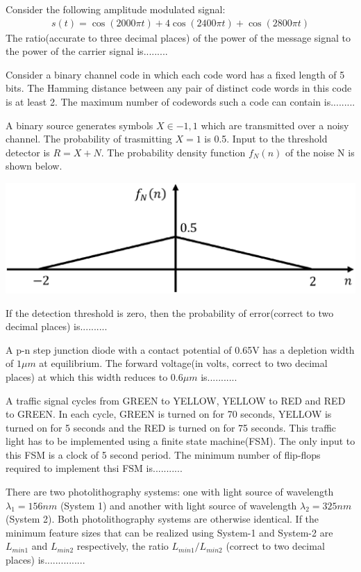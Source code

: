 \item Consider the following amplitude modulated signal:
\begin{align*}
s(t) = \cos(2000\pi t) + 4\cos(2400\pi t) + \cos(2800\pi t)
\end{align*}
The ratio(accurate to three decimal places) of the power of the message signal to the power of the carrier signal is.........

\item Consider a binary channel code in which each code word has a fixed length of 5 bits. The Hamming distance between any pair of distinct code words in this code is at least 2. The maximum number of codewords such a code can contain is.........

\item A binary source generates symbols $X \in {-1, 1}$ which are transmitted over a noisy channel. The probability of trasmitting $X = 1$ is 0.5. Input to the threshold detector is $R = X + N$. The probability density function $f_N(n)$ of the noise N is shown below.

\includegraphics[scale=0.25]{27}

If the detection threshold is zero, then the probability of error(correct to two decimal places) is..........

\item A p-n step junction diode with a contact potential of 0.65V has a depletion width of $1\mu m$ at equilibrium. The forward voltage(in volts, correct to two decimal places) at which this width reduces to $0.6\mu m$ is...........

\item A traffic signal cycles from GREEN to YELLOW, YELLOW to RED and RED to GREEN. In each cycle, GREEN is turned on for 70 seconds, YELLOW is turned on for 5 seconds and the RED is turned on for 75 seconds. This traffic light has to be implemented using a finite state machine(FSM). The only input to this FSM is a clock of 5 second period. The minimum number of flip-flops required to implement thsi FSM is...........

\item There are two photolithography systems: one with light source of wavelength $\lambda_1 = 156nm$ (System 1) and another with light source of wavelength $\lambda_2 = 325nm$ (System 2). Both photolithography systems are otherwise identical. If the minimum feature sizes that can be realized using System-1 and System-2 are $L_{min1}$ and $L_{min2}$ respectively, the ratio $L_{min1}/L_{min2}$ (correct to two decimal places) is...............

